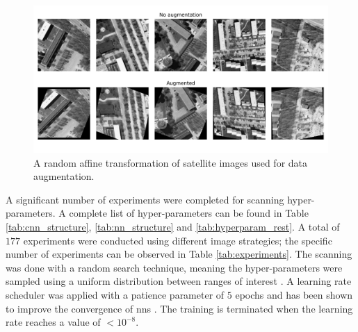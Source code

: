 \begin{figure}
    \centering
    \includegraphics{chapters/part_pathloss/model_aided_paper/data_augmentation.png}
    \caption{A random affine transformation of satellite images used for data augmentation.}
    \label{fig:data_augmentation}
\end{figure}

A significant number of experiments were completed for scanning hyper-parameters. A complete list of hyper-parameters can be found in Table \ref{tab:cnn_structure}, \ref{tab:nn_structure} and \ref{tab:hyperparam_rest}. A total of $177$ experiments were conducted using different image strategies; the specific number of experiments can be observed in Table \ref{tab:experiments}. The scanning was done with a random search technique, meaning the hyper-parameters were sampled using a uniform distribution between ranges of interest \cite{Bergstra2012RandomOptimization}. A learning rate scheduler was applied with a patience parameter of $5$ epochs and has been shown to improve the convergence of \glspl{nn} \cite{SmithSuper-Convergence:Rates}. The training is terminated when the learning rate reaches a value of $< 10^{-8}$.


\begin{table}
    \vspace{1em}
    \caption{Architecture of the sub-models considered in the final model architecture. }\label{tab:nn_structure}
    \end{table}
    

